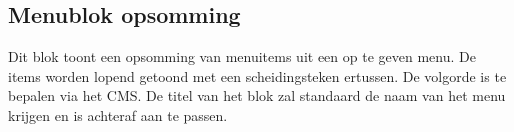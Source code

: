\subsection{Menublok opsomming}
\label{sec:menublokopsomming}
Dit blok toont een opsomming van menuitems uit een op te geven menu. De items worden lopend getoond met een scheidingsteken ertussen. De volgorde is te bepalen via het CMS. De titel van het blok zal standaard de naam van het menu krijgen en is achteraf aan te passen.